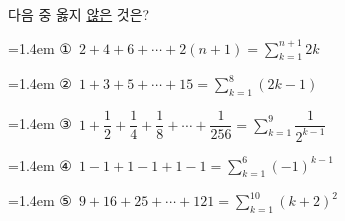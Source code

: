 다음 중 옳지 \underline{않은} 것은?
\par\medskip\par\noindent\hangindent=1.4em {\small ①}\ $2+4+6+\cdots+2(n+1)=\displaystyle\sum_{k=1}^{n+1} 2k$\par\noindent\hangindent=1.4em {\small ②}\ $1+3+5+\cdots+15=\displaystyle\sum_{k=1}^{8} (2k-1)$\par\noindent\hangindent=1.4em {\small ③}\ $1+\dfrac{1}{2}+\dfrac{1}{4}+\dfrac{1}{8}+\cdots+\dfrac{1}{256}=\displaystyle\sum_{k=1}^{9} \dfrac{1}{2^{k-1}}$\par\noindent\hangindent=1.4em {\small ④}\ $1-1+1-1+1-1=\displaystyle\sum_{k=1}^{6} (-1)^{k-1}$\par\noindent\hangindent=1.4em {\small ⑤}\ $9+16+25+\cdots+121=\displaystyle\sum_{k=1}^{10} (k+2)^2$\par\medskip
